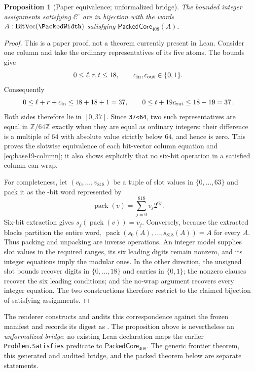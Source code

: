 \documentclass[11pt,twoside]{article}
\newtheorem{proposition}[definition]{Proposition}
\theoremstyle{remark}
\newcommand{\Core}{\ensuremath{\mathcal{C}^{\circ}}}
\begin{document}
\begin{proposition}[Paper equivalence; unformalized bridge]
\label{prop:packed-equivalence}
The bounded integer assignments satisfying $\Core$ are in bijection with the
words $A:\operatorname{BitVec}(\PackedWidth)$ satisfying
$\mathsf{PackedCore}_{408}(A)$.
\end{proposition}

\begin{proof}
This is a paper proof, not a theorem currently present in Lean.  Consider one
column and take the ordinary representatives of its five atoms.  The bounds
give
\[
  0\leq \ell,r,t\leq18,
  \qquad c_{\rm in},c_{\rm out}\in\{0,1\}.
\]
Consequently
\[
  0\leq\ell+r+c_{\rm in}\leq18+18+1=37,
  \qquad
  0\leq t+19c_{\rm out}\leq18+19=37.
\]
Both sides therefore lie in $[0,37]$.  Since \texttt{37<64}, two such
representatives are equal in $\mathbb Z/64\mathbb Z$ exactly when they are
equal as ordinary integers: their difference is a multiple of $64$ with
absolute value strictly below $64$, and hence is zero.  This proves the
slotwise equivalence of each bit-vector column equation and
\cref{eq:base19-column}; it also shows explicitly that no six-bit operation
in a satisfied column can wrap.

For completeness, let $(v_0,\ldots,v_{818})$ be a tuple of slot values in
$\{0,\ldots,63\}$ and pack it as the \PackedWidth-bit word represented by
\[
  \operatorname{pack}(v)=\sum_{j=0}^{818}v_j2^{6j}.
\]
Six-bit extraction gives
$s_j(\operatorname{pack}(v))=v_j$.  Conversely, because the extracted blocks
partition the entire word,
$\operatorname{pack}(s_0(A),\ldots,s_{818}(A))=A$ for every $A$.  Thus
packing and unpacking are inverse operations.  An integer model supplies
slot values in the required ranges, its six leading digits remain nonzero,
and its integer equations imply the modular ones.  In the other direction,
the unsigned slot bounds recover digits in $\{0,\ldots,18\}$ and carries in
$\{0,1\}$; the nonzero clauses recover the six leading conditions; and the
no-wrap argument recovers every integer equation.  The two constructions
therefore restrict to the claimed bijection of satisfying assignments.
\end{proof}

The renderer constructs and audits this correspondence against the frozen
manifest and records its digest as \PackedManifestSha.  The proposition above
is nevertheless an \emph{unformalized bridge}: no existing Lean declaration
maps the earlier \texttt{Problem.Satisfies} predicate to
$\mathsf{PackedCore}_{408}$.  The generic frontier theorem, this generated
and audited bridge, and the packed theorem below are separate statements.
\end{document}
